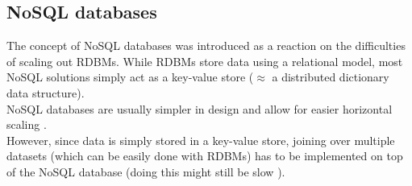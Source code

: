 \documentclass[12pt]{report}
\begin{document}
\subsection{NoSQL databases}
The concept of NoSQL databases was introduced as a reaction on the
difficulties of scaling out RDBMs. While RDBMs store data using a relational
model, most NoSQL solutions simply act as a key-value store ($\approx$
a distributed dictionary data structure).\\
NoSQL databases are usually simpler in design and allow for easier horizontal
scaling \cite{wikipedia_nosql}.\\
However, since data is simply stored in a key-value store, joining
over multiple datasets (which can be easily done with RDBMs) has to be
implemented on top of the NoSQL database (doing this might still
be slow \cite{nosql_problems}). \\
\end{document}
